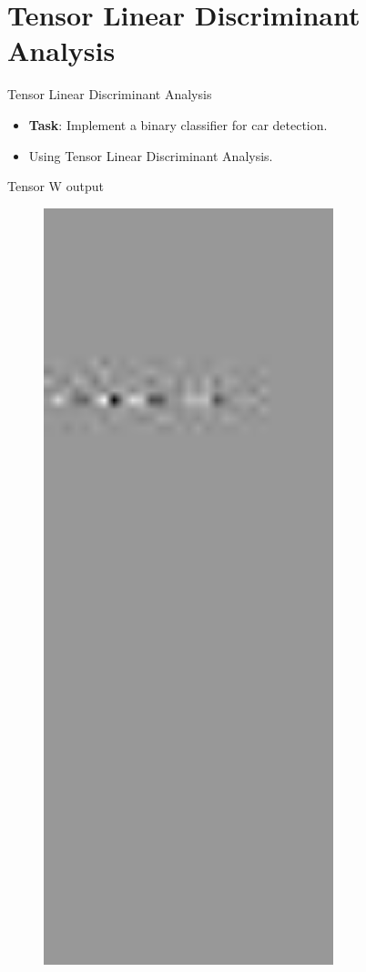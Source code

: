 \documentclass[handout]{beamer}
\begin{document}
\section{Tensor Linear Discriminant Analysis}
\begin{frame}{Tensor Linear Discriminant Analysis}
    \begin{itemize}
        \item \textbf{Task}: Implement a binary classifier for car detection.
        \item Using Tensor Linear Discriminant Analysis.
    \end{itemize}
\end{frame}
\note{}

\begin{frame}{Tensor W output}
    {\centering
    \begin{figure}[H]
        \includegraphics[width=0.75\textwidth]{project_03/tensorWOut.jpg}

\end{figure}}
\end{frame}
\end{document}
